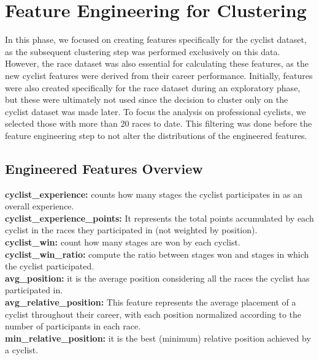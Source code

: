 \section{Feature Engineering for Clustering}
\label{sec:feat_eng}
In this phase, we focused on creating features specifically for the cyclist dataset, as the subsequent clustering step was performed exclusively on this data. However, the race dataset was also essential for calculating these features, as the new cyclist features were derived from their career performance. Initially, features were also created specifically for the race dataset during an exploratory phase, but these were ultimately not used since the decision to cluster only on the cyclist dataset was made later.
To focus the analysis on professional cyclists, we selected those with more than 20 races to date. This filtering was done before the feature engineering step to not alter the distributions of the engineered features.

\subsection{Engineered Features Overview}

\noindent
\textbf{cyclist\_experience:} counts how many stages the cyclist participates in as an overall experience.\\

\noindent
\textbf{cyclist\_experience\_points:} It represents the total points accumulated by each cyclist in the races they participated in (not weighted by position). \\

\noindent
\textbf{cyclist\_win:}
count how many stages are won by each cyclist.\\

\noindent
\textbf{cyclist\_win\_ratio:} compute the ratio between stages won and stages in which the cyclist participated. \\

\noindent
\textbf{avg\_position:} it is the average position considering all the races the cyclist has participated in.\\

\noindent
\textbf{avg\_relative\_position:} This feature represents the average placement of a cyclist throughout their career, with each position normalized according to the number of participants in each race.\\

\noindent
\textbf{min\_relative\_position:} it is the best (minimum) relative position achieved by a cyclist.\\

